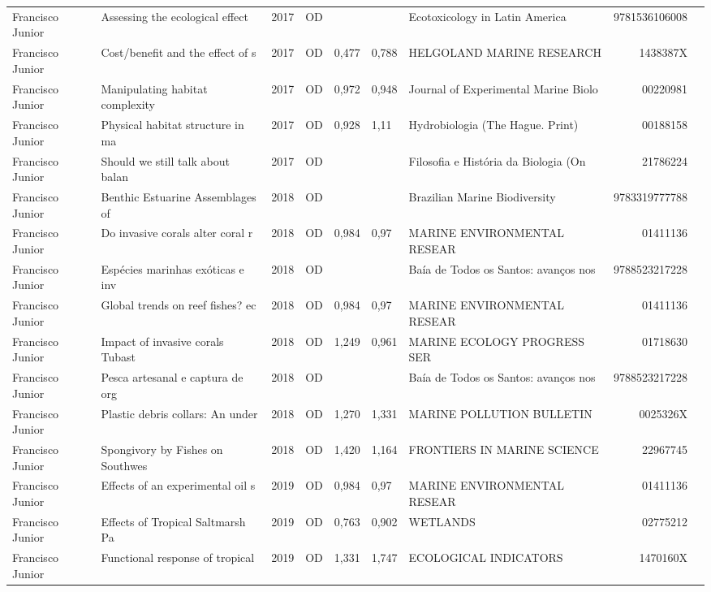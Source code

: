 \documentclass[12pt,brazil]{article}\usepackage[]{graphicx}\usepackage[]{xcolor}
\begin{document}
\begin{longtable}{lllrrllrr}
Francisco Junior & Assessing the ecological effect  & 2017 & OD &  &  & Ecotoxicology in Latin America & 9781536106008 \\
Francisco Junior & Cost/benefit and the effect of s & 2017 & OD & 0,477 & 0,788 & HELGOLAND MARINE RESEARCH & 1438387X \\
Francisco Junior & Manipulating habitat complexity  & 2017 & OD & 0,972 & 0,948 & Journal of Experimental Marine Biolo & 00220981 \\
Francisco Junior & Physical habitat structure in ma & 2017 & OD & 0,928 & 1,11 & Hydrobiologia (The Hague. Print) & 00188158 \\
Francisco Junior & Should we still talk about balan & 2017 & OD &  &  & Filosofia e História da Biologia (On & 21786224 \\
Francisco Junior & Benthic Estuarine Assemblages of & 2018 & OD &  &  & Brazilian Marine Biodiversity & 9783319777788 \\
Francisco Junior & Do invasive corals alter coral r & 2018 & OD & 0,984 & 0,97 & MARINE ENVIRONMENTAL RESEAR & 01411136 \\
Francisco Junior & Espécies marinhas exóticas e inv & 2018 & OD &  &  & Baía de Todos os Santos: avanços nos & 9788523217228 \\
Francisco Junior & Global trends on reef fishes? ec & 2018 & OD & 0,984 & 0,97 & MARINE ENVIRONMENTAL RESEAR & 01411136 \\
Francisco Junior & Impact of invasive corals Tubast & 2018 & OD & 1,249 & 0,961 & MARINE ECOLOGY PROGRESS SER & 01718630 \\
Francisco Junior & Pesca artesanal e captura de org & 2018 & OD &  &  & Baía de Todos os Santos: avanços nos & 9788523217228 \\
Francisco Junior & Plastic debris collars: An under & 2018 & OD & 1,270 & 1,331 & MARINE POLLUTION BULLETIN & 0025326X \\
Francisco Junior & Spongivory by Fishes on Southwes & 2018 & OD & 1,420 & 1,164 & FRONTIERS IN MARINE SCIENCE & 22967745 \\
Francisco Junior & Effects of an experimental oil s & 2019 & OD & 0,984 & 0,97 & MARINE ENVIRONMENTAL RESEAR & 01411136 \\
Francisco Junior & Effects of Tropical Saltmarsh Pa & 2019 & OD & 0,763 & 0,902 & WETLANDS & 02775212 \\
Francisco Junior & Functional response of tropical  & 2019 & OD & 1,331 & 1,747 & ECOLOGICAL INDICATORS & 1470160X \\

\end{longtable}
\end{document}
